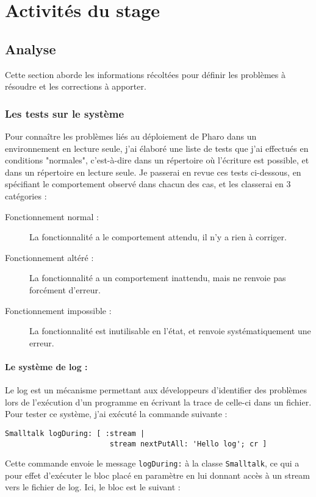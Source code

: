 \section{Activités du stage}
\subsection{Analyse}
Cette section aborde les informations récoltées pour définir les problèmes à résoudre et les corrections à apporter.
\subsubsection{Les tests sur le système}
Pour connaître les problèmes liés au déploiement de Pharo dans un environnement en lecture seule, j'ai élaboré une liste de tests que j'ai effectués en conditions "normales", c'est-à-dire dans un répertoire où l'écriture est possible, et dans un répertoire en lecture seule. Je passerai en revue ces tests ci-dessous, en spécifiant le comportement observé dans chacun des cas, et les classerai en 3 catégories :
\begin{description}
	\item[Fonctionnement normal :] La fonctionnalité a le comportement attendu, il n'y a rien à corriger.
	\item[Fonctionnement altéré :] La fonctionnalité a un comportement inattendu, mais ne renvoie pas forcément d'erreur.
	\item[Fonctionnement impossible :] La fonctionnalité est inutilisable en l'état, et renvoie systématiquement une erreur.
\end{description}

\paragraph{Le système de log :}
Le log est un mécanisme permettant aux développeurs d'identifier des problèmes lors de l'exécution d'un programme en écrivant la trace de celle-ci dans un fichier. Pour tester ce système, j'ai exécuté la commande suivante :
\begin{verbatim}
Smalltalk logDuring: [ :stream |
                        stream nextPutAll: 'Hello log'; cr ]
\end{verbatim}
Cette commande envoie le message \verb$logDuring:$ à la classe \verb$Smalltalk$, ce qui a pour effet d'exécuter le bloc placé en paramètre en lui donnant accès à un stream vers le fichier de log. Ici, le bloc est le suivant :

